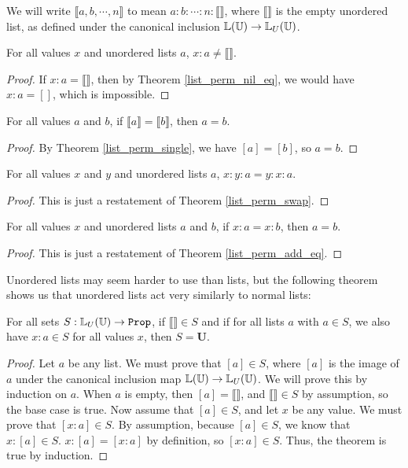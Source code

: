 \documentclass[../../math.tex]{subfiles}
\begin{document}
We will write $\llbracket a, b, \cdots, n\rrbracket$ to mean $a : b : \cdots : n
: \llbracket \rrbracket$, where $\llbracket \rrbracket$ is the empty unordered
list, as defined under the canonical inclusion $\mathbb{L}(\mathbb{U}) \to \mathbb{L}_U(\mathbb{U})$.

\begin{theorem} \label{ulist_end_neq}
    For all values $x$ and unordered lists $a$, $x : a \neq \llbracket
    \rrbracket$.
\end{theorem}
\begin{proof}
    If $x : a = \llbracket \rrbracket$, then by Theorem \ref{list_perm_nil_eq},
    we would have $x : a = []$, which is impossible.
\end{proof}

\begin{theorem} \label{ulist_single_eq}
    For all values $a$ and $b$, if $\llbracket a \rrbracket = \llbracket b
    \rrbracket$, then $a = b$.
\end{theorem}
\begin{proof}
    By Theorem \ref{list_perm_single}, we have $[a] = [b]$, so $a = b$.
\end{proof}

\begin{theorem} \label{ulist_swap}
    For all values $x$ and $y$ and unordered lists $a$, $x : y : a = y : x : a$.
\end{theorem}
\begin{proof}
    This is just a restatement of Theorem \ref{list_perm_swap}.
\end{proof}

\begin{theorem} \label{ulist_add_eq}
    For all values $x$ and unordered lists $a$ and $b$, if $x : a = x : b$, then
    $a = b$.
\end{theorem}
\begin{proof}
    This is just a restatement of Theorem \ref{list_perm_add_eq}.
\end{proof}

Unordered lists may seem harder to use than lists, but the following theorem
shows us that unordered lists act very similarly to normal lists:

\begin{theorem}
    For all sets $S : \set{\L_U(\U)}$, if $\llbracket\rrbracket \in S$ and if
    for all lists $a$ with $a \in S$, we also have $x : a \in S$ for all values
    $x$, then $S = \bm U$.
\end{theorem}
\begin{proof}
    Let $a$ be any list.  We must prove that $[a] \in S$, where $[a]$ is the
    image of $a$ under the canonical inclusion map $\mathbb{L}(\mathbb{U}) \to \mathbb{L}_U(\mathbb{U})$.  We
    will prove this by induction on $a$.  When $a$ is empty, then $[a] =
    \llbracket \rrbracket$, and $\llbracket \rrbracket \in S$ by assumption, so
    the base case is true.  Now assume that $[a] \in S$, and let $x$ be any
    value.  We must prove that $[x : a] \in S$.  By assumption, because $[a] \in
    S$, we know that $x : [a] \in S$.  $x : [a] = [x : a]$ by definition, so $[x
    : a] \in S$.  Thus, the theorem is true by induction.
\end{proof}
\end{document}
